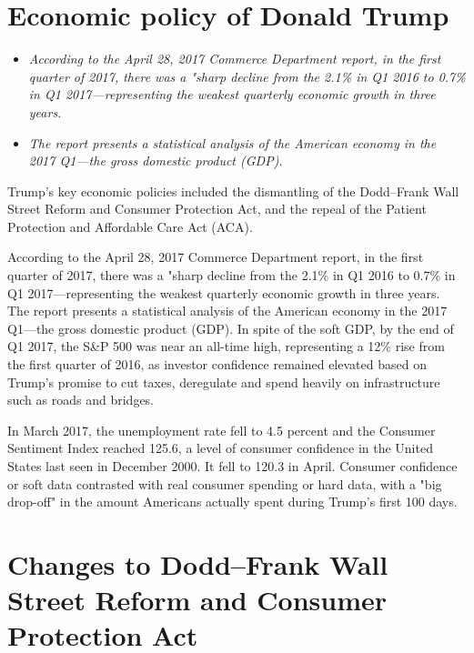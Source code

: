 \section{Economic policy of Donald
Trump}\label{economic-policy-of-donald-trump}

\begin{itemize}
\item
  \emph{According to the April 28, 2017 Commerce Department report, in
  the first quarter of 2017, there was a "sharp decline from the 2.1\%
  in Q1 2016 to 0.7\% in Q1 2017---representing the weakest quarterly
  economic growth in three years.}
\item
  \emph{The report presents a statistical analysis of the American
  economy in the 2017 Q1---the gross domestic product (GDP).}
\end{itemize}

Trump's key economic policies included the dismantling of the
Dodd--Frank Wall Street Reform and Consumer Protection Act, and the
repeal of the Patient Protection and Affordable Care Act (ACA).

According to the April 28, 2017 Commerce Department report, in the first
quarter of 2017, there was a "sharp decline from the 2.1\% in Q1 2016 to
0.7\% in Q1 2017---representing the weakest quarterly economic growth in
three years. The report presents a statistical analysis of the American
economy in the 2017 Q1---the gross domestic product (GDP). In spite of
the soft GDP, by the end of Q1 2017, the S\&P 500 was near an all-time
high, representing a 12\% rise from the first quarter of 2016, as
investor confidence remained elevated based on Trump's promise to cut
taxes, deregulate and spend heavily on infrastructure such as roads and
bridges.

In March 2017, the unemployment rate fell to 4.5 percent and the
Consumer Sentiment Index reached 125.6, a level of consumer confidence
in the United States last seen in December 2000. It fell to 120.3 in
April. Consumer confidence or soft data contrasted with real consumer
spending or hard data, with a "big drop-off" in the amount Americans
actually spent during Trump's first 100 days.

\section{Changes to Dodd--Frank Wall Street Reform and Consumer
Protection
Act}\label{changes-to-doddfrank-wall-street-reform-and-consumer-protection-act}

